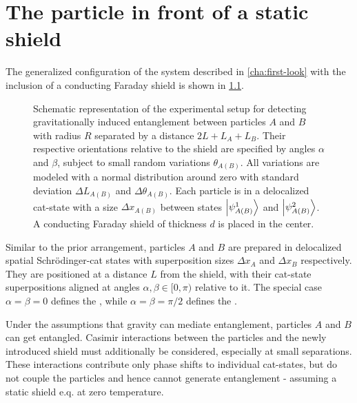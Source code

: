 \chapter{The particle in front of a static shield}\label{cha:entanglement-generation}

The generalized configuration of the system described in \cref{cha:first-look} with the inclusion of a conducting Faraday shield is shown in \cref{fig:4:complete-setup}. 
\begin{figure}[!bhtp]
  \centering
  \def\svgwidth{\textwidth}
  
  \caption{Schematic representation of the experimental setup for detecting gravitationally induced entanglement between particles $A$ and $B$ with radius $R$ separated by a distance $2L + L_A + L_B$. Their respective orientations relative to the shield are specified by angles $\alpha$ and $\beta$, subject to small random variations $\theta_{A(B)}$. All variations are modeled with a normal distribution around zero with standard deviation $\Delta L_{A(B)}$ and $\Delta \theta_{A(B)}$. Each particle is in a delocalized cat-state with a size $\Delta x_{A(B)}$ between states $\ket{\psi_{A(B)}^1}$ and $\ket{\psi_{A(B)}^2}$. A conducting Faraday shield of thickness $d$ is placed in the center.}
  \label{fig:4:complete-setup}
\end{figure}
Similar to the prior arrangement, particles $A$ and $B$ are prepared in delocalized spatial Schrödinger-cat states with superposition sizes $\Delta x_A$ and $\Delta x_B$ respectively.
They are positioned at a distance $L$ from the shield, with their cat-state superpositions aligned at angles $\alpha,\beta\in[0,\pi)$ relative to it.
The special case $\alpha=\beta=0$ defines the , while $\alpha = \beta = \pi/2$ defines the .

Under the assumptions that gravity can mediate entanglement, particles $A$ and $B$ can get entangled.
Casimir interactions between the particles and the newly introduced shield must additionally be considered, especially at small separations.
These interactions contribute only phase shifts to individual cat-states, but do not couple the particles and hence cannot generate entanglement - assuming a static shield e.q. at zero temperature.

